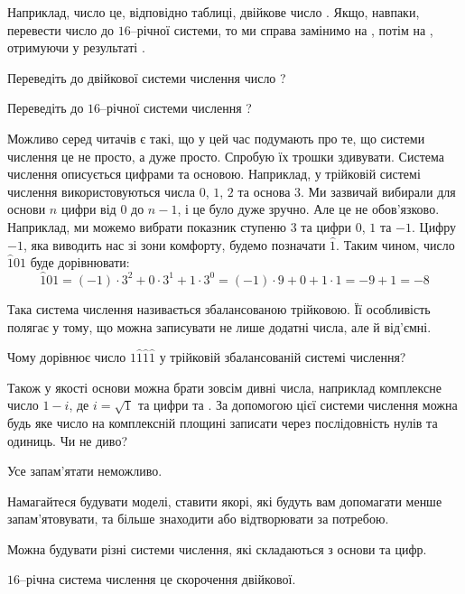 Наприклад, число  це, відповідно таблиці, двійкове число .
Якщо, навпаки,  перевести число  до $16$--річної системи, то ми справа замінимо  на , потім  на , отримуючи у результаті .

\begin{exercise}
Переведіть до двійкової системи числення число ?
\end{exercise}

\begin{exercise}
Переведіть до $16$--річної системи числення ?
\end{exercise}

Можливо серед читачів є такі, що у цей час подумають про те, що системи числення це не просто, а дуже просто.
Спробую їх трошки здивувати.
Система числення описується цифрами та основою.
Наприклад, у трійковій системі числення використовуються числа $0$, $1$, $2$ та основа $3$.
Ми зазвичай вибирали для основи $n$ цифри від $0$ до $n-1$, і це було дуже зручно.
Але це не обов'язково.
Наприклад, ми можемо вибрати показник ступеню $3$ та цифри $0$, $1$ та $-1$.
Цифру $-1$, яка виводить нас зі зони комфорту, будемо позначати $\hat 1$.
Таким чином, число $\hat 101$ буде дорівнювати:
$$
  \hat 101 = (-1) \cdot 3^2 + 0 \cdot 3^1 + 1 \cdot 3^0 = (-1) \cdot 9 + 0 + 1 \cdot 1 = -9 + 1 = -8
$$

Така система числення називається збалансованою трійковою.
Її особливість полягає у тому, що можна записувати не лише додатні числа, але й від'ємні.

\begin{exercise}
Чому дорівнює число $1\hat1\hat1\hat1$ у трійковій збалансованій системі числення?
\end{exercise}

Також у якості основи можна брати зовсім дивні числа, наприклад комплексне число $1-i$, де $i=\sqrt{1}$ та цифри  та .
За допомогою цієї системи числення можна будь яке число на комплексній площині записати через послідовність нулів та одиниць.
Чи не диво?

\begin{summary}
\item Усе запам'ятати неможливо.
\item Намагайтеся будувати моделі, ставити якорі, які будуть вам допомагати менше запам'ятовувати, та більше знаходити або відтворювати за потребою.
\item Можна будувати різні системи числення, які складаються з основи та цифр.
\item $16$--річна система числення це скорочення двійкової.
\end{summary}

